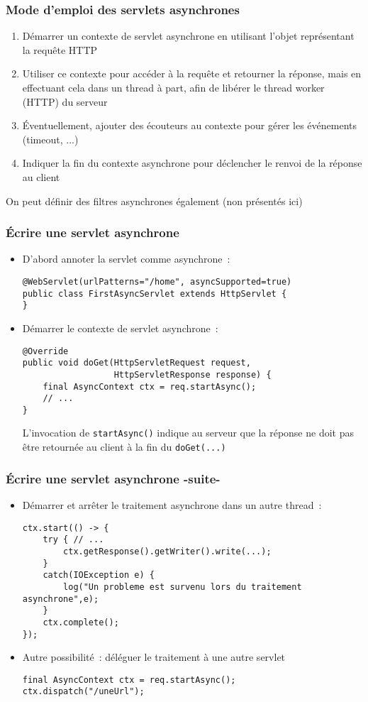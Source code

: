\documentclass{beamer}
\begin{document}
\begin{frame}
	\frametitle{Mode d'emploi des servlets asynchrones}
	\begin{enumerate}
		\item Démarrer un contexte de servlet asynchrone en utilisant l'objet représentant la requête HTTP
		\item Utiliser ce contexte pour accéder à la requête et retourner la réponse, mais en effectuant cela dans un thread à part,  afin de libérer le thread worker (HTTP) du serveur
		\item Éventuellement, ajouter des écouteurs au contexte pour gérer les événements (timeout, ...)
		\item Indiquer la fin du contexte asynchrone pour déclencher le renvoi de la réponse au client
	\end{enumerate}
On peut définir des filtres asynchrones également (non présentés ici)
\end{frame}

\begin{frame}[fragile]
	\frametitle{Écrire une servlet asynchrone}
	\begin{itemize}
		\item D'abord annoter la servlet comme asynchrone~:
\begin{lstlisting}
@WebServlet(urlPatterns="/home", asyncSupported=true)
public class FirstAsyncServlet extends HttpServlet {
}
\end{lstlisting}
\item Démarrer le contexte de servlet asynchrone~:
\begin{lstlisting}
@Override
public void doGet(HttpServletRequest request,
                  HttpServletResponse response) {
	final AsyncContext ctx = req.startAsync();
	// ...
}
\end{lstlisting}
L'invocation de \texttt{startAsync()} indique au serveur que la réponse ne doit pas être retournée au client à la fin du \texttt{doGet(...)}
	\end{itemize}
\end{frame}

\begin{frame}[fragile]
	\frametitle{Écrire une servlet asynchrone -suite-}
	\begin{itemize}
		\item Démarrer et arrêter le traitement asynchrone dans un autre thread~:
\begin{lstlisting}
ctx.start(() -> {
	try { // ...
		ctx.getResponse().getWriter().write(...);
	}
	catch(IOException e) {
		log("Un probleme est survenu lors du traitement asynchrone",e);
	}
	ctx.complete();
});
\end{lstlisting}
\item Autre possibilité~: déléguer le traitement à une autre servlet
\begin{lstlisting}
final AsyncContext ctx = req.startAsync();
ctx.dispatch("/uneUrl");
\end{lstlisting}
	\end{itemize}
\end{frame}
\end{document}
